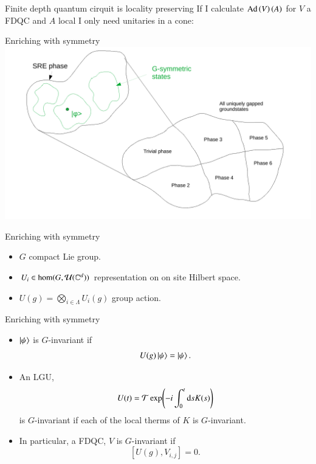 \documentclass{beamer}
\begin{document}
\begin{frame}{Finite depth quantum cirquit is locality preserving}
	If I calculate $\textrm{Ad}\left(V\right)(A)$ for $V$ a FDQC and $A$ local I only need unitaries in a cone:
	\begin{center}
		\scalebox{0.75}{
			
		}
	\end{center}
\end{frame}

\begin{frame}{Enriching with symmetry}
	\includegraphics[width=\textwidth]{Figures/G-invariant_Parts_Of_SRE_Phase.pdf}
\end{frame}

\begin{frame}{Enriching with symmetry}
	\begin{center}
		\scalebox{0.75}{
		
		}
	\end{center}
	\begin{itemize}
		\item $G$ compact Lie group.
		\item $U_i\in\hom(G,\mathcal{U}(\mathbb{C}^d))$ representation on on site Hilbert space.
		\item $U(g)=\bigotimes_{i\in\Lambda}U_i(g)$ group action.
	\end{itemize}
\end{frame}

\begin{frame}{Enriching with symmetry}
	\begin{itemize}
		\item<1-> $\ket{\psi}$ is $G$-invariant if
		\[U(g)\ket{\psi}=\ket{\psi}.\]
		\item<2-> An LGU,
		\[U(t)=\mathcal{T}\exp(-i\int_0^t \textrm{d} s K(s))\]
		is $G$-invariant if each of the local therms of $K$ is $G$-invariant.
		\item<3-> In particular, a FDQC, $V$ is $G$-invariant if
		\[[U(g),V_{i,j}]=0.\]
	\end{itemize}
\end{frame}
\end{document}
